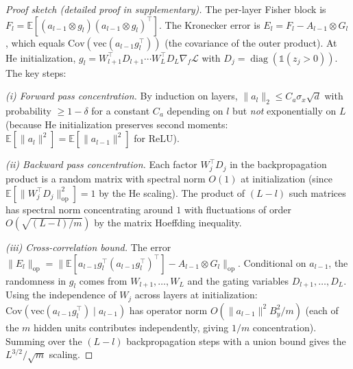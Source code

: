 \documentclass{article}
\providecommand{\E}{\mathbb{E}}
\providecommand{\norm}[1]{\lVert #1 \rVert}
\DeclareMathOperator{\diag}{diag}
\theoremstyle{plain}
\theoremstyle{definition}
\theoremstyle{remark}
\begin{document}
\begin{proof}[Proof sketch (detailed proof in supplementary)]
The per-layer Fisher block is $F_l = \E[(a_{l-1} \otimes g_l)(a_{l-1} \otimes g_l)^\top]$. The Kronecker error is $E_l = F_l - A_{l-1} \otimes G_l$, which equals $\mathrm{Cov}(\mathrm{vec}(a_{l-1}g_l^\top))$ (the covariance of the outer product). At He initialization, $g_l = W_{l+1}^\top D_{l+1} \cdots W_L^\top D_L \nabla_f\mathcal{L}$ with $D_j = \diag(\mathbb{1}(z_j > 0))$. The key steps:

\emph{(i) Forward pass concentration.} By induction on layers, $\norm{a_l}_2 \leq C_a\sigma_x\sqrt{d}$ with probability $\geq 1 - \delta$ for a constant $C_a$ depending on $l$ but \emph{not} exponentially on $L$ (because He initialization preserves second moments: $\E[\norm{a_l}^2] = \E[\norm{a_{l-1}}^2]$ for ReLU).

\emph{(ii) Backward pass concentration.} Each factor $W_j^\top D_j$ in the backpropagation product is a random matrix with spectral norm $O(1)$ at initialization (since $\E[\norm{W_j^\top D_j}_{\mathrm{op}}^2] = 1$ by the He scaling). The product of $(L-l)$ such matrices has spectral norm concentrating around $1$ with fluctuations of order $O(\sqrt{(L-l)/m})$ by the matrix Hoeffding inequality.

\emph{(iii) Cross-correlation bound.} The error $\norm{E_l}_{\mathrm{op}} = \norm{\E[a_{l-1}g_l^\top (a_{l-1}g_l^\top)^\top] - A_{l-1} \otimes G_l}_{\mathrm{op}}$. Conditional on $a_{l-1}$, the randomness in $g_l$ comes from $W_{l+1}, \ldots, W_L$ and the gating variables $D_{l+1}, \ldots, D_L$. Using the independence of $W_j$ across layers at initialization: $\mathrm{Cov}(\mathrm{vec}(a_{l-1}g_l^\top) \mid a_{l-1})$ has operator norm $O(\norm{a_{l-1}}^2 B_y^2 / m)$ (each of the $m$ hidden units contributes independently, giving $1/m$ concentration). Summing over the $(L-l)$ backpropagation steps with a union bound gives the $L^{3/2}/\sqrt{m}$ scaling.
\end{proof}
\end{document}
